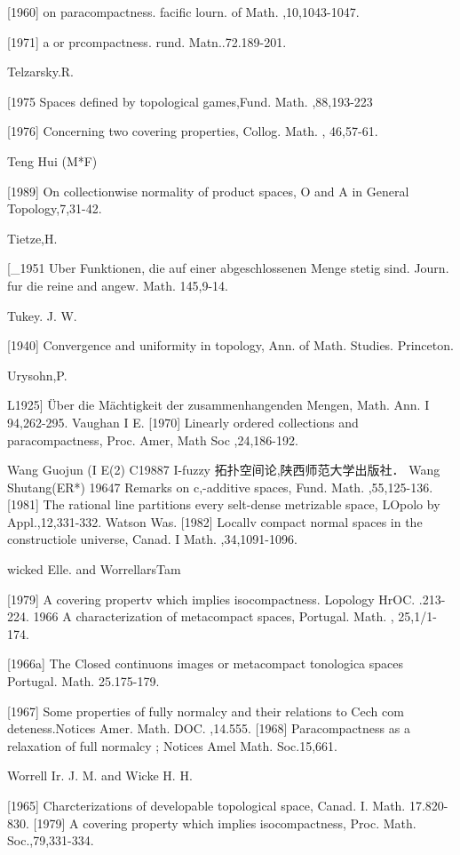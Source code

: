 \documentclass[main.tex]{subfiles}
\begin{document}
{[1960]
on paracompactness. facific lourn.
of Math. ,10,1043-1047.

[1971]
a or prcompactness. rund. Matn..72.189-201.

Telzarsky.R.

[1975 Spaces defined by topological games,Fund. Math. ,88,193-223

[1976]
Concerning two covering properties, Collog. Math. , 46,57-61.

Teng Hui (M*F)

[1989]
On collectionwise normality of product spaces, O and A in General
Topology,7,31-42.

Tietze,H.

[_1951 Uber Funktionen, die auf einer abgeschlossenen Menge stetig sind.
Journ. fur die reine and angew. Math. 145,9-14.

Tukey. J. W.

[1940]
Convergence and uniformity in topology, Ann. of Math. Studies.
Princeton.

Urysohn,P.

L1925] Über die Mächtigkeit der zusammenhangenden Mengen, Math. Ann. I
94,262-295.
Vaughan I E.
[1970] Linearly ordered collections and paracompactness, Proc. Amer, Math
Soc
,24,186-192.

Wang Guojun (I E(2)
	C19887 I-fuzzy 拓扑空间论,陕西师范大学出版社．
	Wang Shutang(ER*)
	19647 Remarks on c,-additive spaces, Fund. Math. ,55,125-136.
	[1981]
	The rational line partitions every selt-dense metrizable space, LOpolo
	by
	Appl.,12,331-332.
	Watson Was.
	[1982]
	Locallv compact normal spaces in the constructiole universe, Canad.
	I Math.
	,34,1091-1096.

	wicked Elle. and WorrellarsTam

	[1979]
	A covering propertv which implies isocompactness. Lopology HrOC.
	.213-224.
	1966 A characterization of metacompact spaces, Portugal. Math. , 25,1/1-
	174.

	[1966a]
	The Closed
	continuons images or metacompact
	tonologica spaces
	Portugal.
	Math. 25.175-179.

	[1967]
	Some properties of fully normalcy and their relations to Cech com
	deteness.Notices Amer. Math.
	DOC. ,14.555.
	[1968]
	Paracompactness as a relaxation of full normalcy
	; Notices Amel
	Math. Soc.15,661.

	Worrell Ir. J. M. and Wicke H. H.

	[1965]
	Charcterizations of developable topological space, Canad.
	I. Math.
	17.820-830.
	[1979]
	A covering property which implies isocompactness, Proc.
	Math. Soc.,79,331-334.

}
\end{document}
